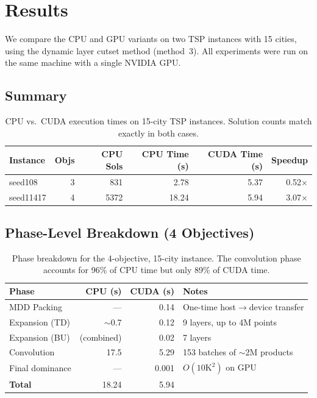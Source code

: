 \documentclass[11pt]{article}
\begin{document}
\section{Results}

We compare the CPU and GPU variants on two TSP instances
with 15 cities, using the dynamic layer cutset method (method~3).
All experiments were run on the same machine with a single NVIDIA GPU.

\subsection{Summary}

\begin{table}[h]
\centering
\begin{tabular}{|l|r|r|r|r|r|}
\hline
\textbf{Instance} & \textbf{Objs} & \textbf{CPU Sols} & \textbf{CPU Time (s)} & \textbf{CUDA Time (s)} & \textbf{Speedup} \\
\hline
seed108   & 3 &  831 &  2.78 & 5.37 & 0.52$\times$ \\
seed11417 & 4 & 5372 & 18.24 & 5.94 & 3.07$\times$ \\
\hline
\end{tabular}
\caption{CPU vs.\ CUDA execution times on 15-city TSP instances.
         Solution counts match exactly in both cases.}
\label{tab:results}
\end{table}

\subsection{Phase-Level Breakdown (4 Objectives)}

\begin{table}[h]
\centering
\begin{tabular}{|l|r|r|l|}
\hline
\textbf{Phase} & \textbf{CPU (s)} & \textbf{CUDA (s)} & \textbf{Notes} \\
\hline
MDD Packing     & ---   & 0.14  & One-time host$\to$device transfer \\
Expansion (TD)  & $\sim$0.7
                        & 0.12  & 9 layers, up to 4M points \\
Expansion (BU)  & (combined)      & 0.02  & 7 layers \\
Convolution     & 17.5  & 5.29  & 153 batches of $\sim$2M products \\
Final dominance & ---   & 0.001 & $O(10\text{K}^2)$ on GPU \\
\hline
\textbf{Total}  & 18.24 & 5.94  & \\
\hline
\end{tabular}
\caption{Phase breakdown for the 4-objective, 15-city instance.
         The convolution phase accounts for 96\% of CPU time
         but only 89\% of CUDA time.}
\label{tab:breakdown}
\end{table}
\end{document}
